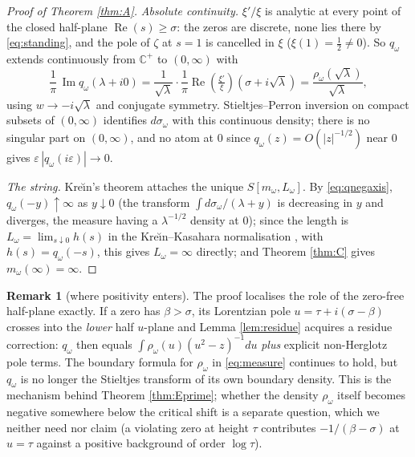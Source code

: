 \documentclass[11pt,reqno]{amsart}
\theoremstyle{plain}
\theoremstyle{definition}
\newtheorem{remark}[theorem]{Remark}
\newcommand{\C}{\mathbb{C}}
\newcommand{\Rp}{\operatorname{Re}}
\newcommand{\Ip}{\operatorname{Im}}
\newcommand{\lxi}[1]{\left(\tfrac{\xi'}{\xi}\right)\!#1}
\begin{document}
\begin{proof}[Proof of Theorem \ref{thm:A}]
\emph{Absolute continuity.} $\xi'/\xi$ is analytic at every point of the closed half-plane
$\Rp(s)\ge\sigma$: the zeros are discrete, none lies there by \eqref{eq:standing}, and the pole
of $\zeta$ at $s=1$ is cancelled in $\xi$ ($\xi(1)=\tfrac12\neq0$). So $q_\omega$ extends
continuously from $\C^+$ to $(0,\infty)$ with
\[
  \frac1\pi\,\Ip q_\omega(\lambda+i0)
  =\frac1{\sqrt\lambda}\cdot\frac1\pi\Rp\lxi{(\sigma+i\sqrt\lambda)}
  =\frac{\rho_\omega(\sqrt\lambda)}{\sqrt\lambda},
\]
using $w\to-i\sqrt\lambda$ and conjugate symmetry. Stieltjes--Perron inversion on compact
subsets of $(0,\infty)$ identifies $d\sigma_\omega$ with this continuous density; there is no
singular part on $(0,\infty)$, and no atom at $0$ since $q_\omega(z)=O(|z|^{-1/2})$ near $0$
gives $\varepsilon\,|q_\omega(i\varepsilon)|\to0$.

\emph{The string.} Kre\u\i n's theorem \cite{Krein1952,KacKrein} attaches the unique
$S[m_\omega,L_\omega]$. By \eqref{eq:qnegaxis}, $q_\omega(-y)\uparrow\infty$ as $y\downarrow0$
(the transform $\int d\sigma_\omega/(\lambda+y)$ is decreasing in $y$ and diverges, the measure
having a $\lambda^{-1/2}$ density at $0$); since the length is
$L_\omega=\lim_{s\downarrow0}h(s)$ in the Kre\u\i n--Kasahara normalisation
\cite[(9)]{Kasahara}, with $h(s)=q_\omega(-s)$, this gives $L_\omega=\infty$ directly;
and Theorem \ref{thm:C} gives $m_\omega(\infty)=\infty$.
\end{proof}

\begin{remark}[where positivity enters]\label{rem:failure}
The proof localises the role of the zero-free half-plane exactly. If a zero has
$\beta>\sigma$, its Lorentzian pole $u=\tau+i(\sigma-\beta)$ crosses into the \emph{lower} half
$u$-plane and Lemma \ref{lem:residue} acquires a residue correction: $q_\omega$ then equals
$\int\rho_\omega(u)(u^2-z)^{-1}du$ \emph{plus} explicit non-Herglotz pole terms. The boundary
formula for $\rho_\omega$ in \eqref{eq:measure} continues to hold, but $q_\omega$ is no longer
the Stieltjes transform of its own boundary density. This is the mechanism behind Theorem
\ref{thm:Eprime}; whether the density $\rho_\omega$ itself becomes negative somewhere below the
critical shift is a separate question, which we neither need nor claim (a violating zero at
height $\tau$ contributes $-1/(\beta-\sigma)$ at $u=\tau$ against a positive background of
order $\log\tau$).
\end{remark}

\end{document}
